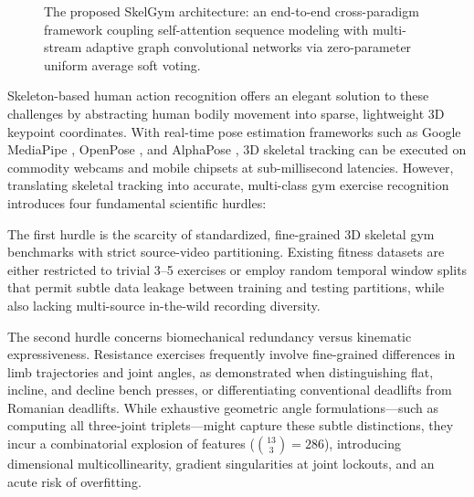 \documentclass[runningheads]{llncs}
\begin{document}
\begin{figure}[!t]
{
}
\caption{The proposed SkelGym architecture: an end-to-end cross-paradigm framework coupling self-attention sequence modeling with multi-stream adaptive graph convolutional networks via zero-parameter uniform average soft voting.}
\label{fig:pipeline_full}
\end{figure}

Skeleton-based human action recognition offers an elegant solution to these challenges by abstracting human bodily movement into sparse, lightweight 3D keypoint coordinates. With real-time pose estimation frameworks such as Google MediaPipe \cite{chuankun2019,bazarevsky2020}, OpenPose \cite{cao2019}, and AlphaPose \cite{fang2022}, 3D skeletal tracking can be executed on commodity webcams and mobile chipsets at sub-millisecond latencies. However, translating skeletal tracking into accurate, multi-class gym exercise recognition introduces four fundamental scientific hurdles:

The first hurdle is the scarcity of standardized, fine-grained 3D skeletal gym benchmarks with strict source-video partitioning. Existing fitness datasets are either restricted to trivial 3--5 exercises or employ random temporal window splits that permit subtle data leakage between training and testing partitions, while also lacking multi-source in-the-wild recording diversity.

The second hurdle concerns biomechanical redundancy versus kinematic expressiveness. Resistance exercises frequently involve fine-grained differences in limb trajectories and joint angles, as demonstrated when distinguishing flat, incline, and decline bench presses, or differentiating conventional deadlifts from Romanian deadlifts. While exhaustive geometric angle formulations---such as computing all three-joint triplets---might capture these subtle distinctions, they incur a combinatorial explosion of features ($\binom{13}{3} = 286$), introducing dimensional multicollinearity, gradient singularities at joint lockouts, and an acute risk of overfitting.
\end{document}
